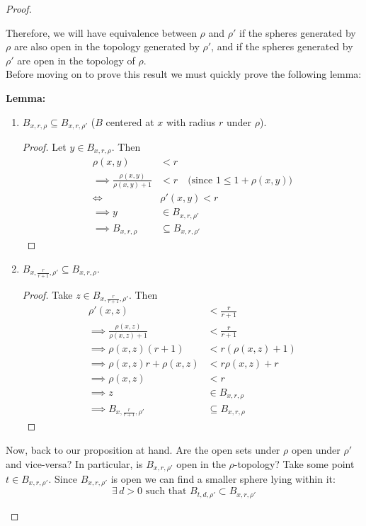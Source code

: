 \documentclass[12pt]{article}
\newlength\tindent
\renewcommand{\indent}{\hspace*{\tindent}}
\begin{document}
\begin{proof}
\begin{enumerate}
	\indent Therefore, we will have equivalence between $\rho$ and $\rho'$ if the spheres generated by $\rho$ are also open in the topology generated by $\rho'$, and if the spheres generated by $\rho'$ are open in the topology of $\rho$. \\
	
	Before moving on to prove this result we must quickly prove the following lemma:
	
	{\bf Lemma:}
	\begin{enumerate}
		\item $B_{x,r,\rho} \subseteq B_{x,r,\rho'}$ ($B$ centered at $x$ with radius $r$ under $\rho$).
		
		\begin{proof} Let $y \in B_{x,r,\rho}$. Then
		\begin{align*}
			\rho(x,y) &< r \\
			\implies \frac{\rho(x,y)}{\rho(x,y) + 1} &< r \quad \text{(since $1 \leq 1 + \rho(x,y)$)} \\
			\iff& \rho'(x,y) < r \\
			\implies y &\in B_{x,r,\rho'} \\
			\implies B_{x,r,\rho} &\subseteq B_{x,r,\rho'}
		\end{align*}
		\end{proof}
		
		\item $B_{x,\frac{r}{r + 1},\rho'} \subseteq B_{x,r,\rho}$.
		
		\begin{proof} Take $z \in B_{x, \frac{r}{r + 1},\rho'}$. Then
		\begin{align*}
			\rho'(x,z) &< \frac{r}{r + 1} \\
			\implies \frac{\rho(x,z)}{\rho(x,z) + 1} &< \frac{r}{r + 1} \\
			\implies \rho(x,z) (r + 1) &< r (\rho(x,z) + 1) \\
			\implies \rho(x,z) r + \rho(x,z) &< r\rho(x,z) + r \\
			\implies \rho(x,z) &< r \\
			\implies z &\in B_{x,r,\rho} \\
			\implies B_{x,\frac{r}{r + 1},\rho'} &\subseteq B_{x,r,\rho}
		\end{align*}
		\end{proof}
	\end{enumerate}
	
	\indent Now, back to our proposition at hand. Are the open sets under $\rho$ open under $\rho'$ and vice-versa? In particular, is $B_{x,r,\rho'}$ open in the $\rho$-topology? Take some point $t \in B_{x,r,\rho'}$. Since $B_{x,r,\rho'}$ is open we can find a smaller sphere lying within it:
	\begin{equation*}
		\exists\,d > 0 \text{ such that } B_{t,d,\rho'} \subset B_{x,r,\rho'}
	\end{equation*}
	

\end{enumerate}
\end{proof}
\end{document}
